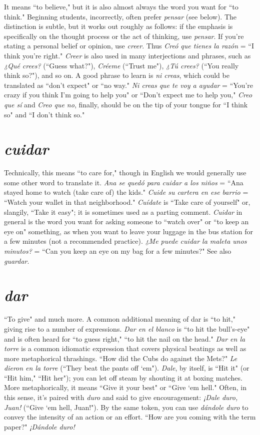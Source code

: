 It means ``to believe," but it is also almost always the word
you want for ``to think." Beginning students, incorrectly, often prefer
\emph{pensar} (see below). The distinction is subtle, but it works out roughly
as follows: if the emphasis is specifically on the thought process or the
act of thinking, use \emph{pensar}. If you're stating a personal belief or opinion, use \emph{creer}. Thus \emph{Creó que tienes la razón} = ``I think you're right."
\emph{Creer} is also used in many interjections and phrases, such as \emph{¿Qué
crees?} (``Guess what?"), \emph{Créeme} (``Trust me"), \emph{¿Tú crees?} (``You really
think so?"), and so on. A good phrase to learn is \emph{ni creas}, which could
be translated as ``don't expect" or ``no way." \emph{Ni creas que te voy a ayudar} = ``You're crazy if you think I'm going to help you" or ``Don't expect me to help you," \emph{Creo que sí} and \emph{Creo que no}, finally, should be
on the tip of your tongue for ``I think so" and ``I don't think so."

\section{\emph{cuidar}}

Technically, this means ``to care for," though in English we
would generally use some other word to translate it. \emph{Ana se quedó
para cuidar a los niños} = ``Ana stayed home to watch (take care of)
the kids." \emph{Cuide su cartera en ese barrio} = ``Watch your wallet in that
neighborhood." \emph{Cuídate} is ``Take care of yourself" or, slangily, ``Take it
easy"; it is sometimes used as a parting comment. \emph{Cuidar} in general is
the word you want for asking someone to ``watch over" or ``to keep an
eye on" something, as when you want to leave your luggage in the bus
station for a few minutes (not a recommended practice). \emph{¿Me puede
cuidar la maleta unos minutos?} = ``Can you keep an eye on my bag
for a few minutes?" See also \emph{guardar}.

\section{\emph{dar}}

``To give" and much more. A common additional meaning of
dar is ``to hit," giving rise to a number of expressions. \emph{Dar en el blanco}
is ``to hit the bull's-eye" and is often heard for ``to guess right," ``to hit
the nail on the head." \emph{Dar en la torre} is a common idiomatic expression that covers physical beatings as well as more metaphorical thrashings. ``How did the Cubs do against the Mets?" \emph{Le dieron en la torre}
(``They beat the pants off `em"). \emph{Dale}, by itself, is ``Hit it" (or ``Hit
him," ``Hit her"); you can let off steam by shouting it at boxing matches.
More metaphorically, it means ``Give it your best" or ``Give `em hell."
Often, in this sense, it's paired with \emph{duro} and said to give encouragement: \emph{¡Dale duro, Juan!} (``Give `em hell, Juan!"). By the same token,
you can use \emph{dándole duro} to convey the intensity of an action or an
effort. ``How are you coming with the term paper?" \emph{¡Dándole duro!}

